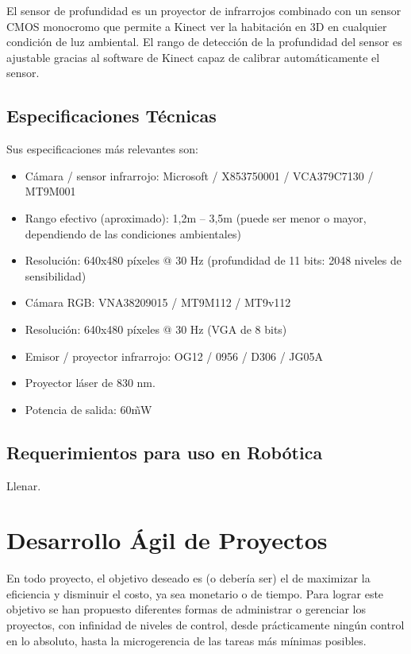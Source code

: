 El sensor de profundidad es un proyector de infrarrojos combinado con un sensor CMOS monocromo que permite a Kinect ver la habitación en 3D en cualquier condición de luz ambiental. El rango de detección de la profundidad del sensor es ajustable gracias al software de Kinect capaz de calibrar automáticamente el sensor.

\subsection{Especificaciones Técnicas}
Sus especificaciones más relevantes son:

\begin{itemize}
	\itemsep1pt \parskip1pt 
	\item Cámara / sensor infrarrojo: Microsoft / X853750001 / VCA379C7130 / MT9M001
	\item Rango efectivo (aproximado): 1,2m – 3,5m (puede ser menor o mayor, dependiendo de las condiciones ambientales)
	\item Resolución: 640x480 píxeles @ 30 Hz (profundidad de 11 bits: 2048 niveles de sensibilidad)
	\item Cámara RGB: VNA38209015 / MT9M112 / MT9v112
	\item Resolución: 640x480 píxeles @ 30 Hz (VGA de 8 bits)
	\item Emisor / proyector infrarrojo: OG12 / 0956 / D306 / JG05A
	\item Proyector láser de 830 nm.
	\item Potencia de salida: 60\~ mW
\end{itemize}

\subsection{Requerimientos para uso en Robótica}

Llenar.

\section{Desarrollo Ágil de Proyectos}

En todo proyecto, el objetivo deseado es (o debería ser) el de maximizar la eficiencia y disminuir el costo, ya sea monetario o de tiempo. Para lograr este objetivo se han propuesto diferentes formas de administrar o gerenciar los proyectos, con infinidad de niveles de control, desde prácticamente ningún control en lo absoluto, hasta la microgerencia de las tareas más mínimas posibles.

